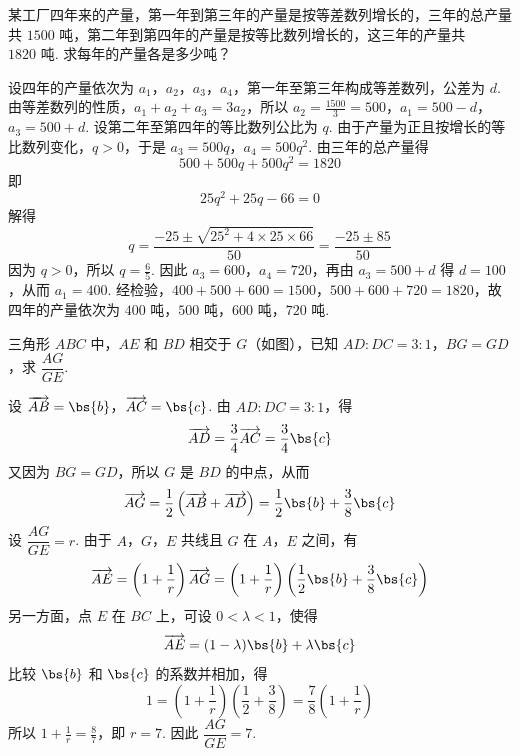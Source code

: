 \begin{problem}
某工厂四年来的产量，第一年到第三年的产量是按等差数列增长的，三年的总产量共 \(1500\text{ 吨}\)，第二年到第四年的产量是按等比数列增长的，这三年的产量共 \(1820\text{ 吨}\). 求每年的产量各是多少吨？
\end{problem}

\begin{solution}
设四年的产量依次为 \(a_1\)，\(a_2\)，\(a_3\)，\(a_4\)，第一年至第三年构成等差数列，公差为 \(d\). 由等差数列的性质，\(a_1+a_2+a_3=3a_2\)，所以
\(a_2=\frac{1500}{3}=500\)，\(a_1=500-d\)，\(a_3=500+d\).
设第二年至第四年的等比数列公比为 \(q\). 由于产量为正且按增长的等比数列变化，\(q>0\)，于是 \(a_3=500q\)，\(a_4=500q^2\). 由三年的总产量得
\[
500+500q+500q^2=1820
\]
即
\[
25q^2+25q-66=0
\]
解得
\[
q=\frac{-25\pm\sqrt{25^2+4\times25\times66}}{50}=\frac{-25\pm85}{50}
\]
因为 \(q>0\)，所以 \(q=\frac{6}{5}\). 因此 \(a_3=600\)，\(a_4=720\)，再由 \(a_3=500+d\) 得 \(d=100\)，从而 \(a_1=400\). 经检验，\(400+500+600=1500\)，\(500+600+720=1820\)，故四年的产量依次为 \(400\text{ 吨}\)，\(500\text{ 吨}\)，\(600\text{ 吨}\)，\(720\text{ 吨}\).
\end{solution}

\begin{problem}
三角形 \(ABC\) 中，\(AE\) 和 \(BD\) 相交于 \(G\)（如图），已知 \(AD:DC=3:1\)，\(BG=GD\)，求 \(\dfrac{AG}{GE}\).

\end{problem}

\begin{solution}
设 \(\overrightarrow{AB}=\bs{b}\)，\(\overrightarrow{AC}=\bs{c}\). 由 \(AD:DC=3:1\)，得
\[
\overrightarrow{AD}=\frac{3}{4}\overrightarrow{AC}=\frac{3}{4}\bs{c}
\]
又因为 \(BG=GD\)，所以 \(G\) 是 \(BD\) 的中点，从而
\[
\overrightarrow{AG}=\frac{1}{2}\left(\overrightarrow{AB}+\overrightarrow{AD}\right)=\frac{1}{2}\bs{b}+\frac{3}{8}\bs{c}
\]
设 \(\dfrac{AG}{GE}=r\). 由于 \(A\)，\(G\)，\(E\) 共线且 \(G\) 在 \(A\)，\(E\) 之间，有
\[
\overrightarrow{AE}=\left(1+\frac{1}{r}\right)\overrightarrow{AG}=\left(1+\frac{1}{r}\right)\left(\frac{1}{2}\bs{b}+\frac{3}{8}\bs{c}\right)
\]
另一方面，点 \(E\) 在 \(BC\) 上，可设 \(0<\lambda<1\)，使得
\[
\overrightarrow{AE}=(1-\lambda)\bs{b}+\lambda\bs{c}
\]
比较 \(\bs{b}\) 和 \(\bs{c}\) 的系数并相加，得
\[
1=\left(1+\frac{1}{r}\right)\left(\frac{1}{2}+\frac{3}{8}\right)=\frac{7}{8}\left(1+\frac{1}{r}\right)
\]
所以 \(1+\frac{1}{r}=\frac{8}{7}\)，即 \(r=7\). 因此 \(\dfrac{AG}{GE}=7\).
\end{solution}
